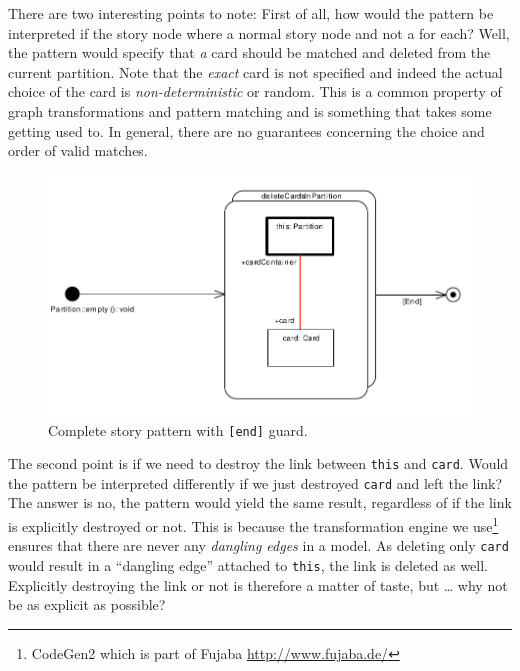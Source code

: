 There are two interesting points to note: First of all, how would the pattern be
interpreted if the story node where a normal story node and not a for each?
Well, the pattern would specify that \emph{a} card should
be matched and deleted from the current partition.  Note that the \emph{exact}
card is not specified and indeed the actual choice of the card is
\emph{non-deterministic} or random.  This is a common property of graph
transformations and pattern matching and is something that takes some getting
used to. In general, there are no guarantees concerning the choice and order of
valid matches.

\begin{figure}[htbp]
\begin{center}
  \includegraphics[width=\textwidth]{pics/sdmBilder/empty/sdm47}
  \caption{Complete story pattern with \texttt{[end]} guard.}  
  \label{fig:sdm_end}
\end{center}
\end{figure}

The second point is if we need to destroy the link between \texttt{this} and
\texttt{card}.  Would the pattern be interpreted differently if we just
destroyed \texttt{card} and left the link?  The answer is no, the pattern would
yield the same result, regardless of if the link is explicitly destroyed or not.
This is because the transformation engine we use\footnote{CodeGen2 which is
part of Fujaba \url{http://www.fujaba.de/}} ensures that there are never any
\emph{dangling edges} in a model.  As deleting only \texttt{card} would result
in a ``dangling edge'' attached to \texttt{this}, the link is deleted as well.
Explicitly destroying the link or not is therefore a matter of taste, but \ldots
why not be as explicit as possible?
